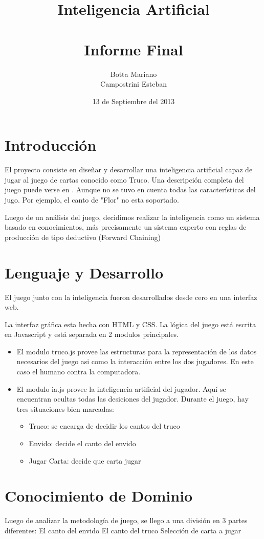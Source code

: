 \documentclass[12pt,a4paper]{article}
\title{Inteligencia Artificial\\
\\ 
\large Informe Final
}
\author{Botta Mariano \\ Campostrini Esteban}
\date{ \small 13 de Septiembre del 2013}
\begin{document}
\maketitle 
\section{Introducci\'on}
El proyecto consiste en diseñar y desarrollar una inteligencia artificial capaz de jugar al juego de cartas conocido como Truco.
Una descripci\'on completa del juego puede verse en \cite{reglas}. Aunque no se tuvo en cuenta todas las caracter\'isticas del jugo. 
Por ejemplo, el canto de "Flor" no esta soportado. 

Luego de un an\'alisis del juego, decidimos realizar la inteligencia como un sistema basado en conocimientos, más precisamente un sistema experto con reglas de 
producción de tipo deductivo (Forward Chaining)

\section{Lenguaje y Desarrollo}
El juego junto con la inteligencia fueron desarrollados desde cero en una interfaz web. 

La interfaz gr\'afica esta hecha con HTML y CSS. La l\'ogica del juego est\'a escrita en Javascript y est\'a separada en 2 modulos principales.  
\begin{itemize}
\item El modulo truco.js provee las estructuras para la representación de los datos necesarios del juego asi como la interacci\'on entre los dos jugadores. 
En este caso el humano contra la computadora. 

\item El modulo ia.js provee la inteligencia artificial del jugador. Aqu\'i se encuentran ocultas todas las desiciones del jugador.
Durante el juego, hay tres situaciones bien marcadas: 
\begin{itemize}
\item Truco: se encarga de decidir los cantos del truco
\item Envido: decide el canto del envido
\item Jugar Carta: decide que carta jugar
\end{itemize}
\end{itemize}

\section{Conocimiento de Dominio}
Luego de analizar la metodología de juego, se llego a una división en 3 partes diferentes:
El canto del envido
El canto del truco
Selección de carta a jugar
 
\end{document}
